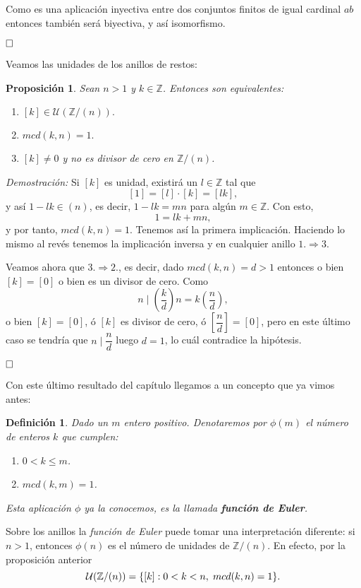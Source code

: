 \documentclass[12pt]{article}
\newtheorem{proposition}[theorem]{Proposición}
\newtheorem{definition}[theorem]{Definición}
\begin{document}
Como es una aplicación inyectiva entre dos conjuntos finitos de igual cardinal $ab$ entonces también será biyectiva, y así isomorfismo.

$\hfill \square$

Veamos las unidades de los anillos de restos:

\begin{proposition} Sean $n >1$ y $k \in \mathbb{Z}$. Entonces son equivalentes: \begin{enumerate}
\item $[k] \in \mathcal{U}(\mathbb{Z}/(n)).$
\item $mcd (k,n) = 1.$
\item $[k] \neq 0$ y no es divisor de cero en $\mathbb{Z}/(n)$.
\end{enumerate}
\end{proposition}
\emph{Demostración: } Si $[k]$ es unidad, existirá un $l \in \mathbb{Z}$ tal que $$[1] = [l] \cdot [k] = [lk],$$ y así $1-lk \in (n)$, es decir, $1-lk = mn$ para algún $m \in \mathbb{Z}$. Con esto, $$1 = lk  + mn,$$ y por tanto, $mcd(k,n) = 1$. Tenemos así la primera implicación. Haciendo lo mismo al revés tenemos la implicación inversa y en cualquier anillo $1.\Rightarrow 3.$

Veamos ahora que $3. \Rightarrow 2.$, es decir, dado $mcd(k,n) = d>1$ entonces o bien $[k] = [0]$ o bien es un divisor de cero. Como $$n \mid \left( \dfrac{k}{d}\right) n = k\left( \dfrac{n}{d}\right),$$ o bien $[k] = [0]$, ó $[k]$ es divisor de cero, ó $\left[\dfrac{n}{d} \right] = [0]$, pero en este último caso se tendría que $n \mid \dfrac{n}{d}$ luego $d = 1$, lo cuál contradice la hipótesis.

$\hfill \square$

Con este último resultado del capítulo llegamos a un concepto que ya vimos antes:
 
\begin{definition} Dado un $m$ entero positivo. Denotaremos por $\phi (m)$ el número de enteros $k$ que cumplen: \begin{enumerate}
\item $0 < k \leq m$.
\item $mcd(k,m) = 1$.
\end{enumerate}
Esta aplicación $\phi$ ya la conocemos, es la llamada \textbf{función de Euler}.
\end{definition}

Sobre los anillos la \textit{función de Euler} puede tomar una interpretación diferente: si $n>1$, entonces $\phi(n)$ es el número de unidades de $\mathbb{Z}/(n)$. En efecto, por la proposición anterior $$\mathcal{U}(\mathbb{Z}/(n)) = \lbrace [k]: 0 < k < n, \hspace{0.1cm} mcd(k,n) = 1 \rbrace.$$
\end{document}
